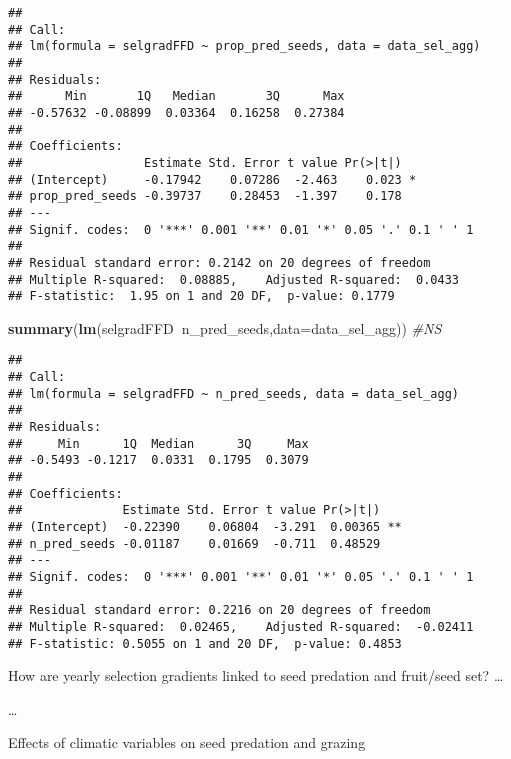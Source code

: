 \documentclass[]{article}
\newenvironment{Shaded}{\begin{snugshade}}{\end{snugshade}}
\newcommand{\KeywordTok}[1]{\textcolor[rgb]{0.13,0.29,0.53}{\textbf{#1}}}
\newcommand{\DataTypeTok}[1]{\textcolor[rgb]{0.13,0.29,0.53}{#1}}
\newcommand{\DecValTok}[1]{\textcolor[rgb]{0.00,0.00,0.81}{#1}}
\newcommand{\CommentTok}[1]{\textcolor[rgb]{0.56,0.35,0.01}{\textit{#1}}}
\newcommand{\OperatorTok}[1]{\textcolor[rgb]{0.81,0.36,0.00}{\textbf{#1}}}
\newcommand{\NormalTok}[1]{#1}
\begin{document}
\begin{verbatim}
## 
## Call:
## lm(formula = selgradFFD ~ prop_pred_seeds, data = data_sel_agg)
## 
## Residuals:
##      Min       1Q   Median       3Q      Max 
## -0.57632 -0.08899  0.03364  0.16258  0.27384 
## 
## Coefficients:
##                 Estimate Std. Error t value Pr(>|t|)  
## (Intercept)     -0.17942    0.07286  -2.463    0.023 *
## prop_pred_seeds -0.39737    0.28453  -1.397    0.178  
## ---
## Signif. codes:  0 '***' 0.001 '**' 0.01 '*' 0.05 '.' 0.1 ' ' 1
## 
## Residual standard error: 0.2142 on 20 degrees of freedom
## Multiple R-squared:  0.08885,    Adjusted R-squared:  0.0433 
## F-statistic:  1.95 on 1 and 20 DF,  p-value: 0.1779
\end{verbatim}

\begin{Shaded}
\begin{Highlighting}[]
\KeywordTok{summary}\NormalTok{(}\KeywordTok{lm}\NormalTok{(selgradFFD}\OperatorTok{~}\NormalTok{n_pred_seeds,}\DataTypeTok{data=}\NormalTok{data_sel_agg)) }\CommentTok{#NS}
\end{Highlighting}
\end{Shaded}

\begin{verbatim}
## 
## Call:
## lm(formula = selgradFFD ~ n_pred_seeds, data = data_sel_agg)
## 
## Residuals:
##     Min      1Q  Median      3Q     Max 
## -0.5493 -0.1217  0.0331  0.1795  0.3079 
## 
## Coefficients:
##              Estimate Std. Error t value Pr(>|t|)   
## (Intercept)  -0.22390    0.06804  -3.291  0.00365 **
## n_pred_seeds -0.01187    0.01669  -0.711  0.48529   
## ---
## Signif. codes:  0 '***' 0.001 '**' 0.01 '*' 0.05 '.' 0.1 ' ' 1
## 
## Residual standard error: 0.2216 on 20 degrees of freedom
## Multiple R-squared:  0.02465,    Adjusted R-squared:  -0.02411 
## F-statistic: 0.5055 on 1 and 20 DF,  p-value: 0.4853
\end{verbatim}

How are yearly selection gradients linked to seed predation and
fruit/seed set? \ldots{}

\ldots{}

Effects of climatic variables on seed predation and grazing

\begin{Shaded}
\end{Shaded}
\end{document}
